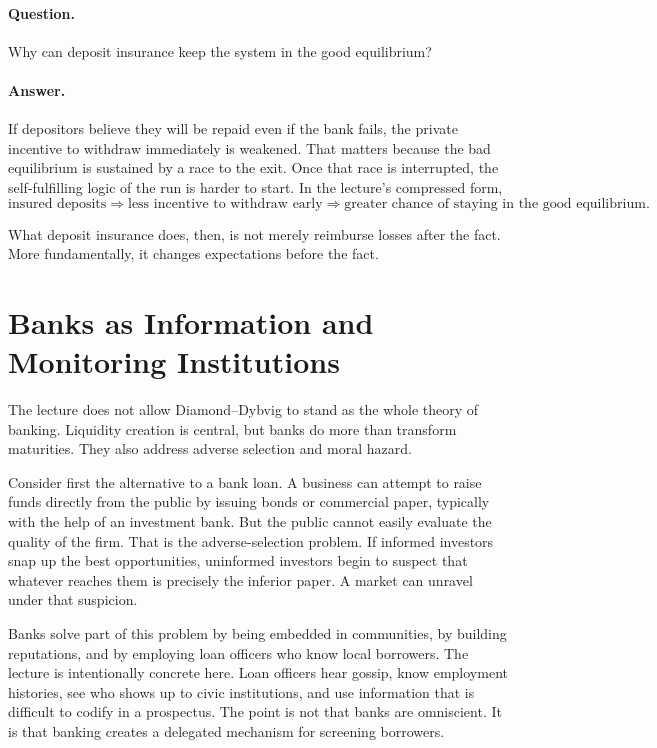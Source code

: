 \paragraph{Question.} Why can deposit insurance keep the system in the good equilibrium?

\paragraph{Answer.} If depositors believe they will be repaid even if the bank fails, the private incentive to withdraw immediately is weakened. That matters because the bad equilibrium is sustained by a race to the exit. Once that race is interrupted, the self-fulfilling logic of the run is harder to start. In the lecture's compressed form,
\begin{equation}
\text{insured deposits}
\Rightarrow
\text{less incentive to withdraw early}
\Rightarrow
\text{greater chance of staying in the good equilibrium}.
\end{equation}

What deposit insurance does, then, is not merely reimburse losses after the fact. More fundamentally, it changes expectations before the fact.

\section{Banks as Information and Monitoring Institutions}

The lecture does not allow Diamond--Dybvig to stand as the whole theory of banking. Liquidity creation is central, but banks do more than transform maturities. They also address adverse selection and moral hazard.

Consider first the alternative to a bank loan. A business can attempt to raise funds directly from the public by issuing bonds or commercial paper, typically with the help of an investment bank. But the public cannot easily evaluate the quality of the firm. That is the adverse-selection problem. If informed investors snap up the best opportunities, uninformed investors begin to suspect that whatever reaches them is precisely the inferior paper. A market can unravel under that suspicion.

Banks solve part of this problem by being embedded in communities, by building reputations, and by employing loan officers who know local borrowers. The lecture is intentionally concrete here. Loan officers hear gossip, know employment histories, see who shows up to civic institutions, and use information that is difficult to codify in a prospectus. The point is not that banks are omniscient. It is that banking creates a delegated mechanism for screening borrowers.

